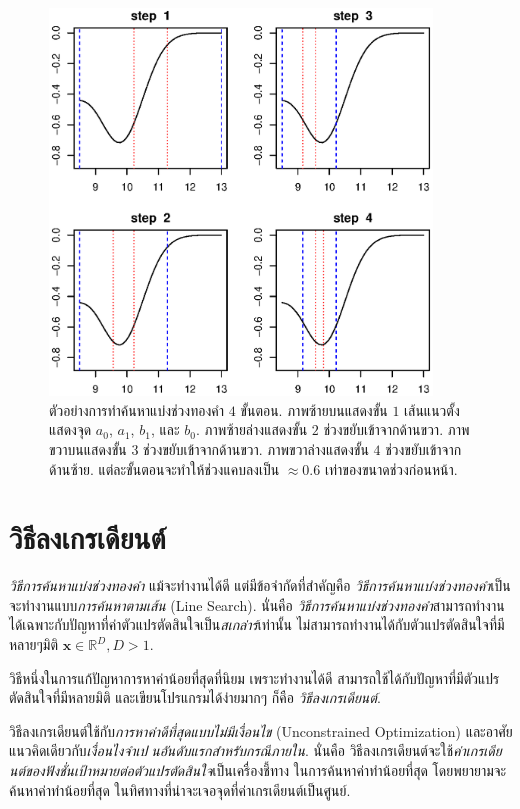 %
\begin{figure}
\begin{center}
\includegraphics[width=4.0in]
{02Background/goldSecEx01.eps}
\end{center}
\caption{ตัวอย่างการทำค้นหาแบ่งช่วงทองคำ $4$ ขั้นตอน.
ภาพซ้ายบนแสดงขั้น $1$ เส้นแนวตั้งแสดงจุด $a_0$, $a_1$, $b_1$, และ $b_0$.
ภาพซ้ายล่างแสดงขั้น $2$ ช่วงขยับเข้าจากด้านขวา.
ภาพขวาบนแสดงขั้น $3$ ช่วงขยับเข้าจากด้านขวา.
ภาพขวาล่างแสดงขั้น $4$ ช่วงขยับเข้าจากด้านซ้าย.
แต่ละขั้นตอนจะทำให้ช่วงแคบลงเป็น $\approx 0.6$ เท่าของขนาดช่วงก่อนหน้า.
}
\label{fig: golden search example}
\end{figure}
%

\section{วิธีลงเกรเดียนต์}
\label{sec: Gradient Descent}

\textit{วิธีการค้นหาแบ่งช่วงทองคำ} แม้จะทำงานได้ดี
แต่มีข้อจำกัดที่สำคัญคือ \textit{วิธีการค้นหาแบ่งช่วงทองคำ}เป็นจะทำงานแบบ\textit{การค้นหาตามเส้น} (Line Search).
นั่นคือ \textit{วิธีการค้นหาแบ่งช่วงทองคำ}สามารถทำงานได้เฉพาะกับปัญหาที่ค่าตัวแปรตัดสินใจเป็น\textit{สเกล่าร์}เท่านั้น 
ไม่สามารถทำงานได้กับตัวแปรตัดสินใจที่มีหลายๆมิติ $\mathbf{x} \in \mathbb{R}^D, D > 1$.

วิธีหนึ่งในการแก้ปัญหาการหาค่าน้อยที่สุดที่นิยม เพราะทำงานได้ดี สามารถใช้ได้กับปัญหาที่มีตัวแปรตัดสินใจที่มีหลายมิติ
และเขียนโปรแกรมได้ง่ายมากๆ ก็คือ \textit{วิธีลงเกรเดียนต์}.

วิธีลงเกรเดียนต์ใช้กับ\textit{การหาค่าดีที่สุดแบบไม่มีเงื่อนไข} 
(Unconstrained Optimization)
และอาศัยแนวคิดเดียวกับ\textit{เงื่อนไงจำเปนอันดับแรกสำหรับกรณีภายใน}.
นั่นคือ วิธีลงเกรเดียนต์จะใช้\textit{ค่าเกรเดียนต์ของฟังชั่นเป้าหมายต่อตัวแปรตัดสินใจ}เป็นเครื่องชี้ทาง ในการค้นหาค่าทำน้อยที่สุด โดยพยายามจะค้นหาค่าทำน้อยที่สุด ในทิศทางที่น่าจะเจอจุดที่ค่าเกรเดียนต์เป็นศูนย์.

